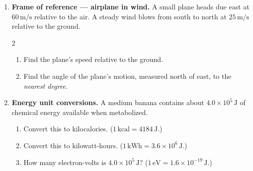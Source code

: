 \documentclass[12pt, twoside]{article}
\begin{document}
\begin{enumerate}
\item \textbf{Frame of reference --- airplane in wind.} A small plane heads due east at $60\,\text{m/s}$ relative to the air. A steady wind blows from south to north at $25\,\text{m/s}$ relative to the ground.\vspace{0.25cm}
\begin{multicols}{2}
  \begin{enumerate}[itemsep=5cm]
    \item Find the plane's speed relative to the ground.
    \item Find the angle of the plane's motion, measured north of east, to the \emph{nearest degree}.\vspace{4cm}
  \end{enumerate}
  \begin{flushright}
  \end{flushright}
\end{multicols}

\newpage

\item \textbf{Energy unit conversions.} A medium banana contains about $4.0\times 10^{5}\,\text{J}$ of chemical energy available when metabolized.
  \begin{enumerate}[itemsep=5cm]
    \item Convert this to kilocalories. ($1\,\text{kcal} = 4184\,\text{J}$.)
    \item Convert this to kilowatt-hours. ($1\,\text{kWh} = 3.6\times 10^{6}\,\text{J}$.)
    \item How many electron-volts is $4.0\times 10^{5}\,\text{J}$? ($1\,\text{eV} = 1.6\times 10^{-19}\,\text{J}$.)
  \end{enumerate}

\end{enumerate}
\end{document}
